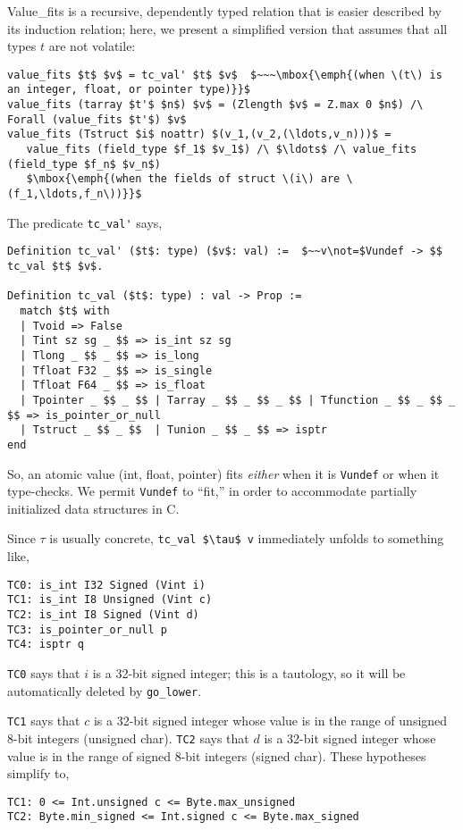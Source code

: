 \documentclass[12pt,fleqn,openany,oneside,showtrims]{memoir}
\begin{document}
Value\_fits is a recursive, dependently typed relation
that is easier described by its induction relation;
here, we present a simplified version that assumes that
all types $t$ are not volatile:
\begin{lstlisting}
value_fits $t$ $v$ = tc_val' $t$ $v$  $~~~\mbox{\emph{(when \(t\) is an integer, float, or pointer type)}}$
value_fits (tarray $t'$ $n$) $v$ = (Zlength $v$ = Z.max 0 $n$) /\ Forall (value_fits $t'$) $v$
value_fits (Tstruct $i$ noattr) $(v_1,(v_2,(\ldots,v_n)))$ =
   value_fits (field_type $f_1$ $v_1$) /\ $\ldots$ /\ value_fits (field_type $f_n$ $v_n$)
   $\mbox{\emph{(when the fields of struct \(i\) are \(f_1,\ldots,f_n\))}}$
\end{lstlisting}
The predicate \lstinline{tc_val'} says,\label{refcard:tcval}
\begin{lstlisting}
Definition tc_val' ($t$: type) ($v$: val) :=  $~~v\not=$Vundef -> $$ tc_val $t$ $v$.

Definition tc_val ($t$: type) : val -> Prop :=
  match $t$ with
  | Tvoid => False
  | Tint sz sg _ $$ => is_int sz sg
  | Tlong _ $$ _ $$ => is_long
  | Tfloat F32 _ $$ => is_single
  | Tfloat F64 _ $$ => is_float
  | Tpointer _ $$ _ $$ | Tarray _ $$ _ $$ _ $$ | Tfunction _ $$ _ $$ _ $$ => is_pointer_or_null
  | Tstruct _ $$ _ $$  | Tunion _ $$ _ $$ => isptr
end
\end{lstlisting}
So, an atomic value (int, float, pointer) fits \emph{either} when
it is \lstinline{Vundef} or when it type-checks.
We permit \lstinline{Vundef}  to ``fit,'' in order to accommodate
partially initialized data structures in C.

Since $\tau$ is usually concrete, \lstinline{tc_val $\tau$ v}
immediately unfolds
to something like,
\begin{lstlisting}
TC0: is_int I32 Signed (Vint i)
TC1: is_int I8 Unsigned (Vint c)
TC2: is_int I8 Signed (Vint d)
TC3: is_pointer_or_null p
TC4: isptr q
\end{lstlisting}

\lstinline{TC0} says that $i$ is a 32-bit signed integer;
this is a tautology, so it will be automatically deleted by
\lstinline{go_lower}.

\lstinline{TC1} says that $c$ is a 32-bit signed integer
whose value is in the range of unsigned 8-bit integers
(unsigned char).
\lstinline{TC2} says that $d$ is a 32-bit signed integer
whose value is in the range of signed 8-bit integers
(signed char).
These hypotheses simplify to,
\begin{lstlisting}
TC1: 0 <= Int.unsigned c <= Byte.max_unsigned
TC2: Byte.min_signed <= Int.signed c <= Byte.max_signed
\end{lstlisting}
\end{document}
